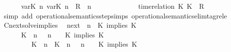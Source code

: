 \begin{isabellebody}
\ \ \ \ {\isasymsupseteq}\ {\isacharbraceleft}\ {\isacharparenleft}{\isacharparenleft}{\isasymlfloor}{\isasymtau}\isactrlsub v\isactrlsub a\isactrlsub r{\isacharparenleft}K\ n{\isacharparenright}{\isacharcomma}\ {\isasymtau}\isactrlsub v\isactrlsub a\isactrlsub r{\isacharparenleft}K\ n{\isacharparenright}{\isasymrfloor}\ {\isasymin}\ R{\isacharparenright}\ {\isacharhash}\ {\isasymGamma}{\isacharparenright}{\isacharcomma}n\isanewline
\ \ \ \ \ \ \ \ \ \ {\isasymturnstile}\ {\isasymPsi}\ {\isasymtriangleright}\ {\isacharparenleft}{\isacharparenleft}time{\isacharminus}relation\ {\isasymlfloor}K\ K\ {\isasymin}\ R{\isacharparenright}\ {\isacharhash}\ {\isasymPhi}{\isacharparenright}\ {\isacharbraceright}{\isacartoucheclose}\isanewline
%
\isadelimproof
%
\endisadelimproof
%
\isatagproof
{}\isamarkupfalse%
\ {\isacharparenleft}simp\ add{\isacharcolon}\ operational{\isacharunderscore}semantics{\isacharunderscore}step{\isachardot}simps\ operational{\isacharunderscore}semantics{\isacharunderscore}elim{\isachardot}tagrel{\isacharunderscore}e{\isacharparenright}%
\endisatagproof
{\isafoldproof}%
%
\isadelimproof
\isanewline
%
\endisadelimproof
\isanewline
{}\isamarkupfalse%
\ Cnext{\isacharunderscore}solve{\isacharunderscore}implies{\isacharcolon}\isanewline
\ \ {\isacartoucheopen}{\isacharparenleft}{\isasymC}\isactrlsub n\isactrlsub e\isactrlsub x\isactrlsub t\ {\isacharparenleft}{\isasymGamma}{\isacharcomma}\ n\ {\isasymturnstile}\ {\isacharparenleft}{\isacharparenleft}K\ implies\ K\ {\isacharhash}\ {\isasymPsi}{\isacharparenright}\ {\isasymtriangleright}\ {\isasymPhi}{\isacharparenright}{\isacharparenright}\isanewline
\ \ \ \ {\isasymsupseteq}\ {\isacharbraceleft}\ {\isacharparenleft}{\isacharparenleft}K\ {\isasymnot}{\isasymUp}\ n{\isacharparenright}\ {\isacharhash}\ {\isasymGamma}{\isacharparenright}{\isacharcomma}\ n\ {\isasymturnstile}\ {\isasymPsi}\ {\isasymtriangleright}\ {\isacharparenleft}{\isacharparenleft}K\ implies\ K\ {\isacharhash}\ {\isasymPhi}{\isacharparenright}{\isacharcomma}\isanewline
\ \ \ \ \ \ \ \ \ {\isacharparenleft}{\isacharparenleft}K\ {\isasymUp}\ n{\isacharparenright}\ {\isacharhash}\ {\isacharparenleft}K\ {\isasymUp}\ n{\isacharparenright}\ {\isacharhash}\ {\isasymGamma}{\isacharparenright}{\isacharcomma}\ n\ {\isasymturnstile}\ {\isasymPsi}\ {\isasymtriangleright}\ {\isacharparenleft}{\isacharparenleft}K\ implies\ K\ {\isacharhash}\ {\isasymPhi}{\isacharparenright}\ {\isacharbraceright}{\isacartoucheclose}\isanewline

\end{isabellebody}
